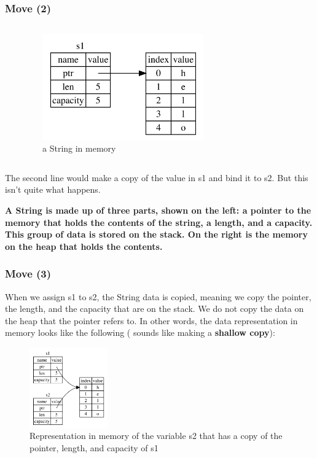 \documentclass{beamer}
\begin{document}
\begin{frame}[fragile]
	\frametitle{Move (2)}
	
	\begin{columns}
		\inputminted{rust}{./code/move-string.rs}
		\begin{figure}
			\centering
			\includegraphics[width=0.65\textwidth]{./img/trpl04-01.png}
			\caption{a String in memory}
			\label{fig:figureS1}
		\end{figure}
	\end{columns}
	
	The second line would make a copy of the value in s1 and bind it to s2. But this isn’t quite what happens.
	
	\textbf{A String is made up of three parts, shown on the left: a pointer to the memory that holds the contents of the string, a length, and a capacity. This group of data is stored on the stack. On the right is the memory on the heap that holds the contents.}
\end{frame}


\begin{frame}[fragile]
	\frametitle{Move (3)}
	When we assign s1 to s2, the String data is copied, meaning we copy the pointer, the length, and the capacity that are on the stack. We do not copy the data on the heap that the pointer refers to. In other words, the data representation in memory looks like the following ( sounds like making a \textbf{shallow copy}):
		\begin{figure}
		\centering
		\includegraphics[width=0.3\textwidth]{./img/trpl04-02.png}
		\caption{Representation in memory of the variable s2 that has a copy of the pointer, length, and capacity of s1}
		\label{fig:figureS2}
	\end{figure}
\end{frame}
\end{document}
